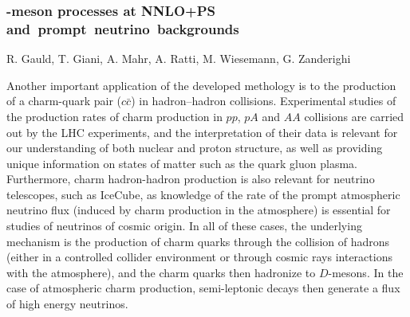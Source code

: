 \documentclass{FBR_Bericht_2025}
\begin{document}
\begin{refsection}
\subsubsection[$D$-meson processes at NNLO+PS and prompt neutrino backgrounds]{-meson processes at NNLO+PS \mbox{and prompt neutrino backgrounds}}
\begin{Namen}
R. Gauld, T. Giani, A. Mahr, A. Ratti, M. Wiesemann, G. Zanderighi
\end{Namen}

Another important application of the developed \minnlo{} methology is to the production
of a charm-quark pair ($c\bar c$) in hadron--hadron collisions. 
%
Experimental studies of the production rates of charm production in $pp$, $pA$ and $AA$ collisions are carried out by the LHC experiments, and the interpretation of their data is relevant for our understanding of both nuclear and proton structure, as well as providing unique information on states of matter such as the quark gluon plasma.
%
%
%
Furthermore, charm hadron-hadron production is also relevant for neutrino telescopes, such as IceCube, as knowledge of the rate of the prompt atmospheric neutrino flux (induced by charm production in the atmosphere) is essential for studies of neutrinos of cosmic origin.
%
In all of these cases, the underlying mechanism is the production of charm quarks through the collision
of hadrons (either in a controlled collider environment or through cosmic rays interactions 
with the atmosphere), and the charm quarks then hadronize to $D$-mesons. In the case of atmospheric charm production, 
semi-leptonic decays then generate a flux of high energy neutrinos. 



\end{refsection}
\end{document}
